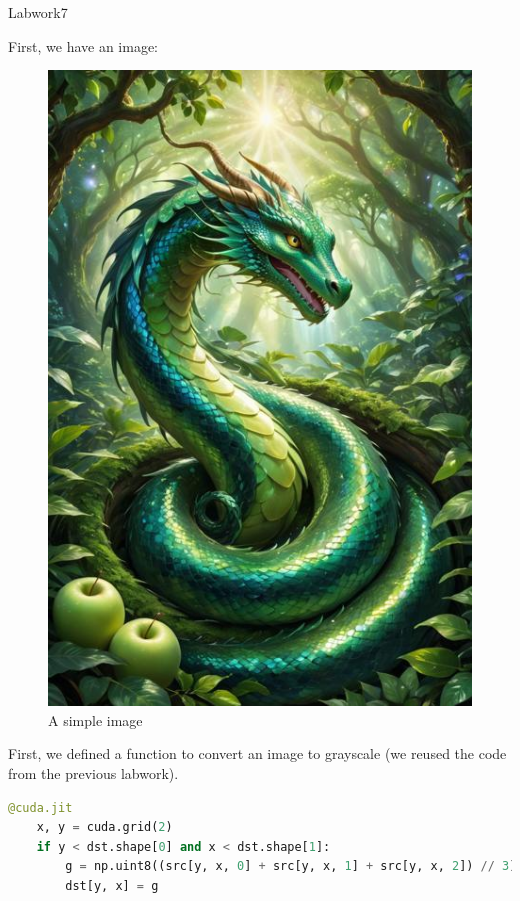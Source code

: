 \documentclass[12pt]{article}
\begin{document}
\begin{center}
    \vspace*{1.8cm}
    \Large
    Labwork7\\
\end{center}

\noindent
First, we have an image:
\begin{figure}[H]
\centering
    \includegraphics[height = 0.5\textheight, keepaspectratio]{images/image.jpeg}
    \caption{A simple image}
\end{figure}


\noindent
First, we defined a function to convert an image to grayscale (we reused the code from the previous labwork).

\begin{lstlisting}[language=Python]
@cuda.jit
    x, y = cuda.grid(2)
    if y < dst.shape[0] and x < dst.shape[1]:
        g = np.uint8((src[y, x, 0] + src[y, x, 1] + src[y, x, 2]) // 3)
        dst[y, x] = g
\end{lstlisting}
\end{document}
